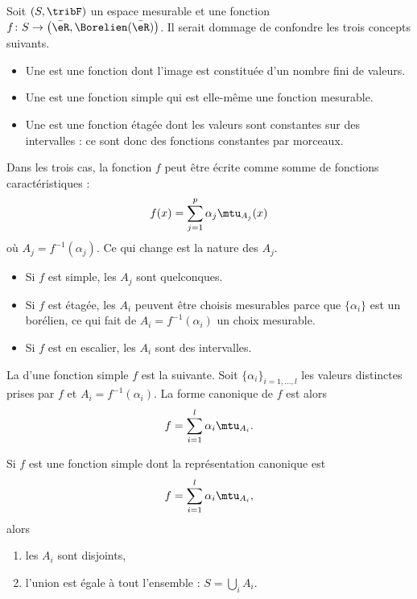 \begin{definition}\label{DefBPCxdel}
	Soit \( (S,\tribF)\) un espace mesurable et une fonction \( f\colon S\to \big( \bar\eR,\Borelien(\bar\eR) \big)\). Il serait dommage de confondre les trois concepts suivants.
	\begin{itemize}
		\item
		      Une  est une fonction dont l'image est constituée d'un nombre fini de valeurs.
		\item
		      Une  est une fonction simple qui est elle-même une fonction mesurable.
		\item
		      Une  est une fonction étagée dont les valeurs sont constantes sur des intervalles : ce sont donc des fonctions constantes par morceaux.
	\end{itemize}
\end{definition}

Dans les trois cas, la fonction \( f\) peut être écrite comme somme de fonctions caractéristiques :
\begin{equation}
	f(x)=\sum_{j=1}^p\alpha_j\mtu_{A_j}(x)
\end{equation}
où \( A_j=f^{-1}(\alpha_j)\). Ce qui change est la nature des \( A_j\).

\begin{itemize}
	\item Si \( f\) est  simple, les \( A_j\) sont quelconques.
	\item Si \( f\) est étagée, les \( A_i\) peuvent être choisis mesurables parce que \( \{\alpha_i \}\) est un borélien, ce qui fait de \( A_i=f^{-1}(\alpha_i)\) un choix mesurable.
	\item Si \( f\) est en escalier, les \( A_i\) sont des intervalles.
\end{itemize}

\begin{definition}		\label{DEFooKWQLooBRGore}
	La  d'une fonction simple \( f\) est la suivante. Soit \( \{ \alpha_i \}_{i=1,\ldots, l}\) les valeurs distinctes prises par \( f\) et \( A_i=f^{-1}(\alpha_i)\). La forme canonique de \( f\) est alors
	\begin{equation}
		f=\sum_{i=1}^l\alpha_i\mtu_{A_i}.
	\end{equation}
\end{definition}

\begin{lemma}   \label{LEMooNWLTooCDuRQI}
	Si \( f\) est une fonction simple dont la représentation canonique est
	\begin{equation}
		f=\sum_{i=1}^l\alpha_i\mtu_{A_i},
	\end{equation}
	alors
	\begin{enumerate}
		\item
		      les \( A_i\) sont disjoints,
		\item
		      l'union est égale à tout l'ensemble : \( S=\bigcup_iA_i\).
	\end{enumerate}
\end{lemma}

